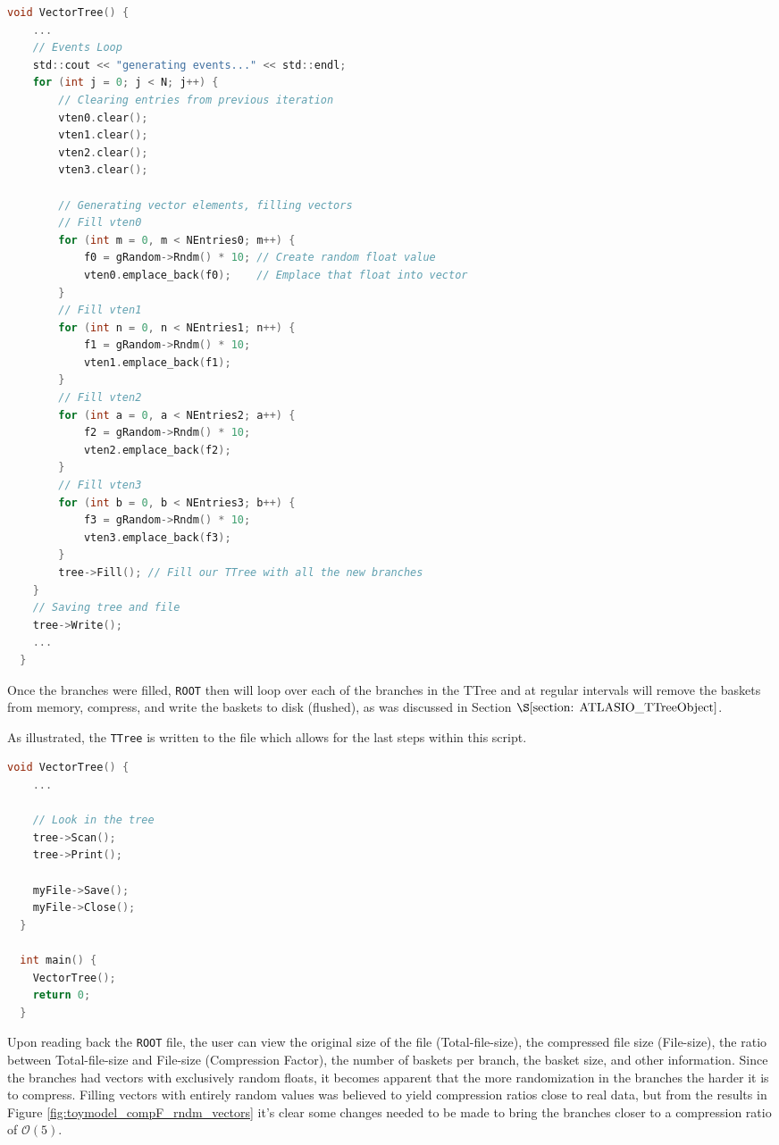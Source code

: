 \begin{lstlisting}[language=C]  
  void VectorTree() {
    ...
    // Events Loop
    std::cout << "generating events..." << std::endl;
    for (int j = 0; j < N; j++) {
        // Clearing entries from previous iteration
        vten0.clear();
        vten1.clear();
        vten2.clear();
        vten3.clear();

        // Generating vector elements, filling vectors
        // Fill vten0
        for (int m = 0, m < NEntries0; m++) {
            f0 = gRandom->Rndm() * 10; // Create random float value
            vten0.emplace_back(f0);    // Emplace that float into vector
        }
        // Fill vten1
        for (int n = 0, n < NEntries1; n++) {
            f1 = gRandom->Rndm() * 10;
            vten1.emplace_back(f1);
        }
        // Fill vten2
        for (int a = 0, a < NEntries2; a++) {
            f2 = gRandom->Rndm() * 10;
            vten2.emplace_back(f2);
        }
        // Fill vten3
        for (int b = 0, b < NEntries3; b++) {
            f3 = gRandom->Rndm() * 10;
            vten3.emplace_back(f3);
        }
        tree->Fill(); // Fill our TTree with all the new branches
    }
    // Saving tree and file
    tree->Write();
    ...
  }
\end{lstlisting}
Once the branches were filled, \verb|ROOT| then will loop over each of the branches in the TTree and at regular intervals will remove the baskets from memory, compress, and write the baskets to disk (flushed), as was discussed in Section $\S \ref{section: ATLASIO_TTreeObject}$.

As illustrated, the \verb|TTree| is written to the file which allows for the last steps within this script. 

\begin{lstlisting}[language=C]  
  void VectorTree() {
    ...

    // Look in the tree
    tree->Scan();
    tree->Print();

    myFile->Save();
    myFile->Close();
  }

  int main() {
    VectorTree();
    return 0;
  } 
\end{lstlisting}

Upon reading back the \verb|ROOT| file, the user can view the original size of the file (Total-file-size), the compressed file size (File-size), the ratio between Total-file-size and File-size (Compression Factor), the number of baskets per branch, the basket size, and other information. 
Since the branches had vectors with exclusively random floats, it becomes apparent that the more randomization in the branches the harder it is to compress. 
Filling vectors with entirely random values was believed to yield compression ratios close to real data, but from the results in Figure \ref{fig:toymodel_compF_rndm_vectors} it's clear some changes needed to be made to bring the branches closer to a compression ratio of $\mathcal{O}(5)$.  

